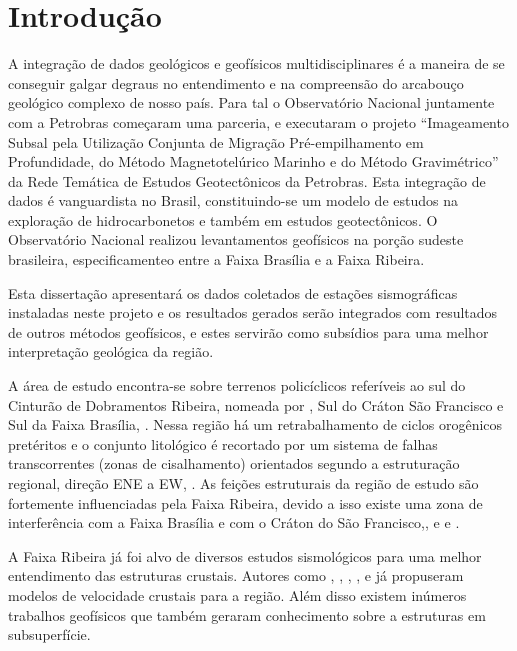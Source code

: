 \chapter{Introdução}

A integração de dados geológicos e geofísicos multidisciplinares é a maneira de se conseguir galgar degraus no entendimento e na compreensão do arcabouço geológico complexo de nosso país. Para tal o Observatório Nacional juntamente com a Petrobras começaram uma parceria, e executaram o projeto “Imageamento Subsal pela Utilização Conjunta de Migração Pré-empilhamento em Profundidade, do Método Magnetotelúrico Marinho e do Método Gravimétrico” da Rede Temática de Estudos Geotectônicos da Petrobras. Esta integração de dados é vanguardista no Brasil, constituindo-se um modelo de estudos na exploração de hidrocarbonetos e também em estudos geotectônicos. O Observatório Nacional realizou levantamentos geofísicos na porção sudeste brasileira, especificamenteo entre a Faixa Brasília e a Faixa Ribeira. 

Esta dissertação apresentará os dados coletados de estações sismográficas instaladas neste projeto e os resultados gerados serão integrados com resultados de outros métodos geofísicos, e estes servirão como subsídios para uma melhor interpretação geológica da região. 

A área de estudo encontra-se sobre terrenos policíclicos referíveis ao sul do Cinturão de Dobramentos Ribeira, nomeada por \cite{Riccomini_1989}, Sul do Cráton São Francisco e Sul da Faixa Brasília, \cite{Almeida_Carneiro_1998}. Nessa região há um retrabalhamento de ciclos orogênicos pretéritos e o conjunto litológico é recortado por um sistema de falhas transcorrentes (zonas de cisalhamento) orientados segundo a estruturação regional, direção ENE a EW, \cite{Hasui_Sadowski_1976}. As feições estruturais da região de estudo são fortemente influenciadas pela Faixa Ribeira, devido a isso existe uma zona de interferência com a Faixa Brasília e com o Cráton do São Francisco,\cite{kuhn_metamorphic_2004}, \cite{heilbron_evolution_2010} e \cite{valeriano_u_pb_2011} e \cite{heilbron_serra_2013}.

A Faixa Ribeira já foi alvo de diversos estudos sismológicos para uma melhor entendimento das estruturas crustais. Autores como \cite{Bassini_1986}, \cite{souza_crustal_1991}, \cite{souza_shear-wave_1995}, \cite{assumpcao_crustal_2002},\cite{dias_cario_crustal_2006} e \cite{sand_franca_crustal_2004} já propuseram modelos de velocidade crustais para a região. Além disso existem inúmeros trabalhos geofísicos que também geraram conhecimento sobre a estruturas em subsuperfície. 

